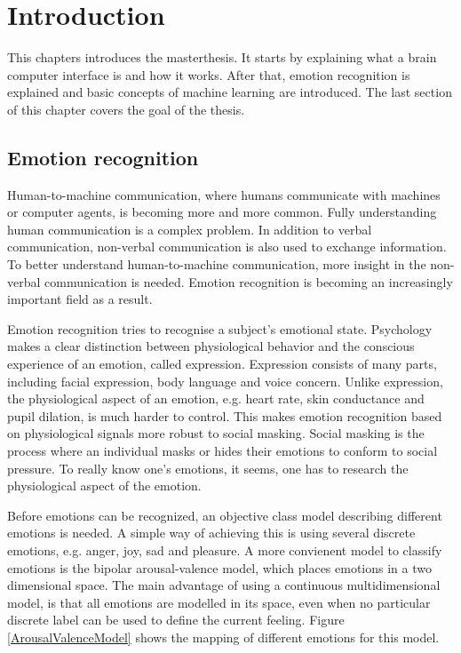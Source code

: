 \chapter{Introduction}
{\samenvatting This chapters introduces the masterthesis. It starts by explaining what a brain computer interface is and how it works. After that, emotion recognition is explained and basic concepts of machine learning are introduced. The last section of this chapter covers the goal of the thesis.} %

\section{Emotion recognition}

Human-to-machine communication, where humans communicate with machines or computer agents, is becoming more and more common\citep{hummaccom}. Fully understanding human communication is a complex problem. In addition to verbal communication, non-verbal communication is also used to exchange information\citep{EmotionRelativePower}. To better understand human-to-machine communication, more insight in the non-verbal communication is needed. Emotion recognition is becoming an increasingly important field as a result\citep{RealTimeEEGEmotion}.

\npar 

Emotion recognition tries to recognise a subject's emotional state. Psychology makes a clear distinction between physiological behavior and the conscious experience of an emotion, called expression\cite{ExtendedPaper}. Expression consists of many parts, including facial expression, body language and voice concern\citep{EMSpeech}. Unlike expression, the physiological aspect of an emotion, e.g. heart rate, skin conductance and pupil dilation, is much harder to control. This makes emotion recognition based on physiological signals more robust to social masking\citep{PhytoEm}. Social masking is the process where an individual masks or hides their emotions to conform to social pressure. To really know one's emotions, it seems, one has to research the physiological aspect of the emotion.

\npar

\label{valarrdomspace}
Before emotions can be recognized, an objective class model describing different emotions is needed. A simple way of achieving this is using several discrete emotions, e.g. anger, joy, sad and pleasure. A more convienent model to classify emotions is the bipolar arousal-valence model\cite{ExtendedPaper,RealTimeEEGEmotion}, which places emotions in a two dimensional space. The main advantage of using a continuous multidimensional model, is that all emotions are modelled in its space, even when no particular discrete label can be used to define the current feeling. Figure \ref{ArousalValenceModel} shows the mapping of different emotions for this model. 

